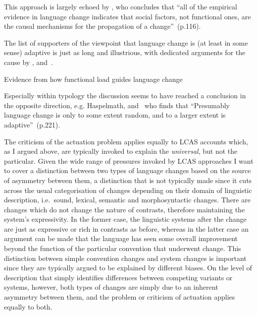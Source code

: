 
This approach is largely echoed by \citet{Croft2006}, who concludes that ``all of the empirical evidence in language change indicates that social factors, not functional ones, are the causal mechanisms for the propagation of a change''~(p.116).


The list of supporters of the viewpoint that language change is (at least in some sense) adaptive is just as long and illustrious, with dedicated arguments for the cause by \citet{Jespersen1949}, \citet{Vennemann1993} and~\citet{Haspelmath1999}.

Evidence from how functional load guides language change~\citep{Wedel2013short}

Especially within typology the discussion seems to have reached a conclusion in the opposite direction, e.g. Haspelmath, and~\citet{Wichmann2015} who finds that ``Presumably language change is only to some extent random, and to a larger extent is adaptive''~(p.221).

The criticism of the actuation problem applies equally to LCAS accounts which, as I argued above, are typically invoked to explain the \emph{universal}, but not the particular. Given the wide range of pressures invoked by LCAS approaches I want to cover a distinction between two types of language changes based on the source of asymmetry between them, a distinction that is not typically made since it cuts across the usual categorisation of changes depending on their domain of linguistic description, i.e.~sound, lexical, semantic and morphosyntactic changes.
There are changes which do not change the nature of contrasts, therefore maintaining the system's expressivity. In the former case, the linguistic systems after the change are just as expressive or rich in contrasts as before, whereas in the latter case an argument can be made that the language has seen some overall improvement beyond the function of the particular convention that underwent change.
This distinction between simple convention changes and system changes is important since they are typically argued to be explained by different biases. On the level of description that simply identifies differences between competing variants or systems, however, both types of changes are simply due to an inherent asymmetry between them, and the problem or criticism of actuation applies equally to both.

